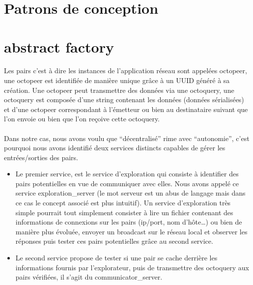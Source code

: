 \documentclass[a4paper]{article}
\begin{document}
		\newpage

	\section{Patrons de conception}
	
		\section{abstract factory}
		
			\paragraph{}{
			Les pairs c’est à dire les instances de l’application réseau sont appelées octopeer, 
			une octopeer est identifiée de manière unique grâce à un UUID généré à sa création. \newline
			Une octopeer peut transmettre des données via une octoquery, une octoquery est composée
			 d’une string contenant les données (données sérialisées) et d’une octopeer correspondant à 
			 l’émetteur ou bien au destinataire suivant que l’on envoie ou bien que l’on reçoive cette octoquery.
			}
			
			\paragraph{}{
			Dans notre cas, nous avons voulu que “décentralisé” rime avec “autonomie”, c’est pourquoi nous 
			avons identifié deux services distincts capables de gérer les entrées/sorties des pairs.
			}
			\begin{itemize}
				\item Le premier service, est le service d’exploration qui consiste à identifier des pairs
				potentielles en vue de communiquer avec elles. Nous avons appelé ce service exploration\_server 
				(le mot serveur est un abus de langage mais dans ce cas le concept associé est plus intuitif). 
				Un service d’exploration très simple pourrait tout simplement consister à lire un fichier contenant
				des informations de connexions sur les pairs (ip/port, nom d'hôte…) ou bien de manière plus évoluée, 
				envoyer un broadcast sur le réseau local et observer les réponses puis tester ces pairs potentielles 
				grâce au second service.
				
				\item Le second service propose de tester si une pair se cache derrière les informations fournis 
				par l’explorateur, puis de transmettre des octoquery aux pairs vérifiées, il s’agit du communicator\_server.
			\end{itemize}
			
\end{document}
